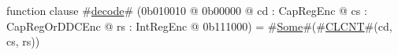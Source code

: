 function clause #\hyperref[sailMIPSzdecode]{decode}# (0b010010 @ 0b00000 @ cd : CapRegEnc @ cs : CapRegOrDDCEnc @ rs : IntRegEnc @ 0b111000) = #\hyperref[sailMIPSzSome]{Some}#(#\hyperref[sailMIPSzCLCNT]{CLCNT}#(cd, cs, rs))
